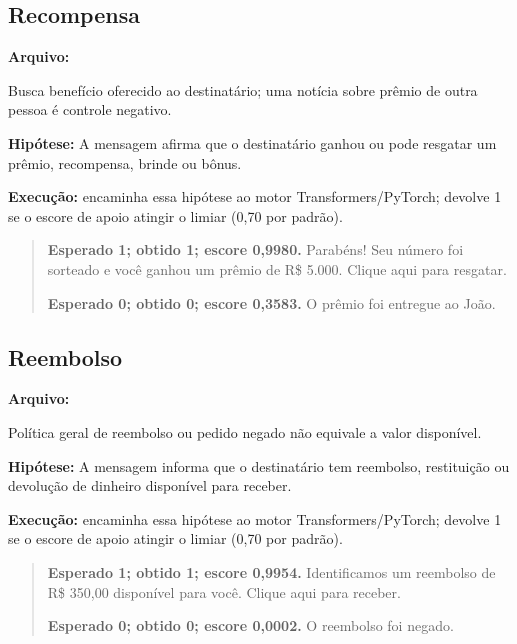 \clearpage

\subsection{Recompensa}

\textbf{Arquivo:} \par

Busca benefício oferecido ao destinatário; uma notícia sobre prêmio de outra pessoa é controle negativo.

\textbf{Hipótese:} A mensagem afirma que o destinatário ganhou ou pode resgatar um prêmio, recompensa, brinde ou bônus.

\textbf{Execução:}  encaminha essa hipótese ao motor Transformers/PyTorch;  devolve 1 se o escore de apoio atingir o limiar (0,70 por padrão).

\begin{quote}\small

\textbf{Esperado 1; obtido 1; escore 0,9980.} Parabéns! Seu número foi sorteado e você ganhou um prêmio de R\$ 5.000. Clique aqui para resgatar.\par

\textbf{Esperado 0; obtido 0; escore 0,3583.} O prêmio foi entregue ao João.\par

\end{quote}

\subsection{Reembolso}

\textbf{Arquivo:} \par

Política geral de reembolso ou pedido negado não equivale a valor disponível.

\textbf{Hipótese:} A mensagem informa que o destinatário tem reembolso, restituição ou devolução de dinheiro disponível para receber.

\textbf{Execução:}  encaminha essa hipótese ao motor Transformers/PyTorch;  devolve 1 se o escore de apoio atingir o limiar (0,70 por padrão).

\begin{quote}\small

\textbf{Esperado 1; obtido 1; escore 0,9954.} Identificamos um reembolso de R\$ 350,00 disponível para você. Clique aqui para receber.\par

\textbf{Esperado 0; obtido 0; escore 0,0002.} O reembolso foi negado.\par

\end{quote}

